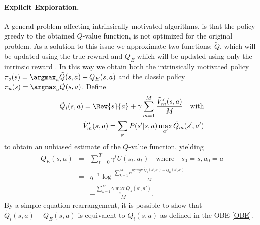 \paragraph{Explicit Exploration.} A general problem affecting intrinsically motivated algorithms, is that the policy greedy to the obtained $Q$-value function, is not optimized for the original problem. As a solution to this issue we approximate two functions: $\tilde{Q}$, which will be updated using the true reward and $Q_E$ which will be updated using only the intrinsic reward \cite{szita2008many}. In this way we obtain both the intrinsically motivated policy $\pi_o(s) = \argmax_{a} \tilde{Q}(s,a) + Q_E(s,a)$ and the classic policy  $\pi_u(s) = \argmax_{a} \tilde{Q}(s,a)$.
Define 
\begin{eqnarray}
	\tilde{Q}_i(s,a) = \Rew{s}{a} + \gamma \sum_{m=1}^M\frac{\tilde{V}_m'(s,a)}{M} \quad \text{with} \\
	\tilde{V}_m'(s,a) =  \sum_{s'} P(s'|s,a)\max_{a'}\tilde{Q}_m(s',a') \label{unbiasedQ}
\end{eqnarray}
to obtain an unbiased estimate of the $Q$-value function, yielding
\begin{eqnarray}
Q_E(s,a) & = & \sum_{t=0}^T \gamma^t U(s_t,a_t) \quad \text{where} \quad s_0 = s, a_0 = a \nonumber \\
& = & \eta^{-1}\log \frac{\sum_{k=1}^M e^{\eta\gamma\max_{a'}\tilde{Q}_k(s',a') + Q_E(s',a')}}{M}\nonumber \\
& &  -  \frac{\sum_{k=1}^M \gamma\max_{a'}\tilde{Q}_k(s',a')}{M}.
\end{eqnarray}
By a simple equation rearrangement, it is possible to show that $\tilde{Q}_i(s,a) + Q_E(s,a)$ is equivalent to $Q_i(s,a)$ as defined in the OBE \eqref{OBE}. 
 
